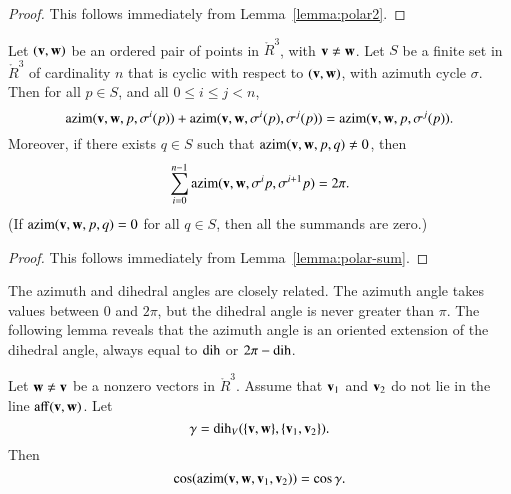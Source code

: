 \begin{proof} This follows immediately from Lemma~\ref{lemma:polar2}.
\end{proof}

\begin{lemma} \label{lemma:2pi-sum}
Let $({\mathbf v},{\mathbf w})$ be an ordered pair of points in $\ring{R}^3$,
with ${\mathbf v}\ne {\mathbf w}$.  Let $S$ be a finite set in $\ring{R}^3$ of
cardinality $n$ that
is cyclic with respect to $({\mathbf v},{\mathbf w})$,
with azimuth cycle $\sigma$.
Then for all $p\in S$,
and all $0\le i \le j < n$,
   $$
   {\operatorname{azim}}({\mathbf v},{\mathbf w},p,\sigma^i(p)) +
    {\operatorname{azim}}({\mathbf v},{\mathbf w},\sigma^i(p),\sigma^j(p)) =
   {\operatorname{azim}}({\mathbf v},{\mathbf w},p,\sigma^j(p)).
   $$
Moreover, if there exists $q\in S$ such that 
${\operatorname{azim}}({\mathbf v},{\mathbf w},p,q)\ne0$,
then
  $$
  \sum_{i=0}^{n-1} {\operatorname{azim}}({\mathbf v},{\mathbf w},\sigma^ip,\sigma^{i+1}p) = 2\pi.
  $$
(If ${\operatorname{azim}}({\mathbf v},{\mathbf w},p,q)=0$ for all $q\in S$, then all the
summands are zero.)
\end{lemma}
%
%
%
%
%

\begin{proof} This follows immediately from 
Lemma~\ref{lemma:polar-sum}.
\end{proof}


The azimuth and dihedral angles are closely related.   
The azimuth angle takes values between $0$ and $2\pi$, but the dihedral
angle is never greater than $\pi$.  The following lemma reveals that
the azimuth angle is an oriented extension of the dihedral angle, always
equal to $\operatorname{dih}$ or $2\pi - \operatorname{dih}$.
%
%
%
%


\begin{lemma}\label{lemma:dih-azim}
Let ${\mathbf w}\ne {\mathbf v}$ be a nonzero vectors in $\ring{R}^3$.
  Assume that ${\mathbf v}_1$ and ${\mathbf v}_2$ do not lie in the line ${\operatorname{aff}}({\mathbf v},{\mathbf w})$.
Let
  $$\gamma = \operatorname{dih}_V(\{{\mathbf v},{\mathbf w}\},\{{\mathbf v}_1,{\mathbf v}_2\}).$$
  Then
    $$
    \cos({\operatorname{azim}}({\mathbf v},{\mathbf w},{\mathbf v}_1,{\mathbf v}_2)) = \cos\gamma.
    $$
\end{lemma}

